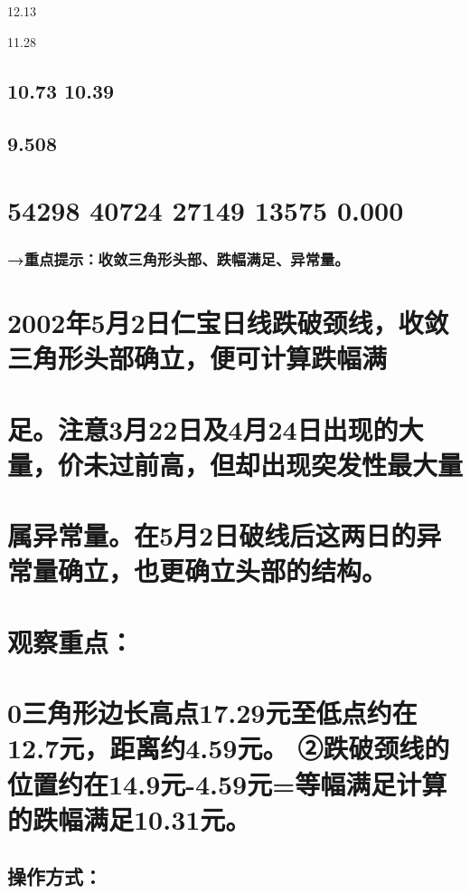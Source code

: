 \documentclass{article}
\begin{document}
12.13

11.28

\subsection{10.73 10.39}

\subsection{9.508}

\section{54298 40724 27149 13575 0.000}

\subsubsection{→重点提示：收敛三角形头部、跌幅满足、异常量。}

\section{2002年5月2日仁宝日线跌破颈线，收敛三角形头部确立，便可计算跌幅满}

\section{足。注意3月22日及4月24日出现的大量，价未过前高，但却出现突发性最大量}

\section{属异常量。在5月2日破线后这两日的异常量确立，也更确立头部的结构。}

\section{观察重点：}

\section{0三角形边长高点17.29元至低点约在12.7元，距离约4.59元。 ②跌破颈线的位置约在14.9元-4.59元=等幅满足计算的跌幅满足10.31元。}

\subsection{操作方式：}
\end{document}
